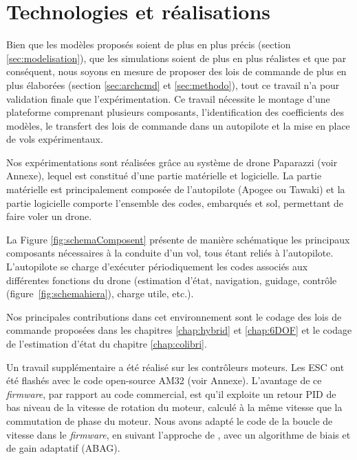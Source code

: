 \section{Technologies et réalisations}

Bien que les modèles proposés soient de plus en plus précis (section \ref{sec:modelisation}), que les simulations soient de plus en plus réalistes et que par conséquent, nous soyons en mesure de proposer des lois de commande de plus en plus élaborées (section \ref{sec:archcmd} et \ref{sec:methodo}), tout ce travail n'a pour validation finale que l'expérimentation. Ce travail nécessite  le montage d'une plateforme comprenant plusieurs composants, l'identification des coefficients des modèles, le transfert des lois de commande dans un autopilote et la mise en place de vols expérimentaux.


Nos expérimentations sont réalisées grâce au système de drone Paparazzi (voir Annexe), lequel est constitué d'une partie matérielle et logicielle. La partie matérielle est principalement composée de l'autopilote (Apogee ou Tawaki) et la partie logicielle comporte l'ensemble des codes, embarqués et sol, permettant de faire voler un drone. 

La Figure \ref{fig:schemaComposent} présente de manière schématique les principaux composants nécessaires à la conduite d'un vol, tous étant reliés à l'autopilote. L'autopilote se charge d'exécuter périodiquement les codes associés aux différentes fonctions du drone (estimation d'état, navigation, guidage, contrôle (figure~\ref{fig:schemahiera}), charge utile, etc.).


Nos principales contributions dans cet environnement sont le codage des lois de commande proposées dans les chapitres \ref{chap:hybrid} et \ref{chap:6DOF} et le codage de l'estimation d'état du chapitre \ref{chap:colibri}. 

Un travail supplémentaire a été réalisé sur les contrôleurs moteurs. Les ESC ont été flashés avec le code open-source AM32 (voir Annexe). L'avantage de ce \textit{firmware}, par rapport au code commercial, est qu'il exploite un retour PID de bas niveau de la vitesse de rotation du moteur, calculé à la même vitesse que la commutation de phase du moteur. Nous avons adapté le code de la boucle de vitesse dans le \textit{firmware}, en suivant l'approche de \cite{franchi2017}, avec un algorithme de biais et de gain adaptatif (ABAG). 

